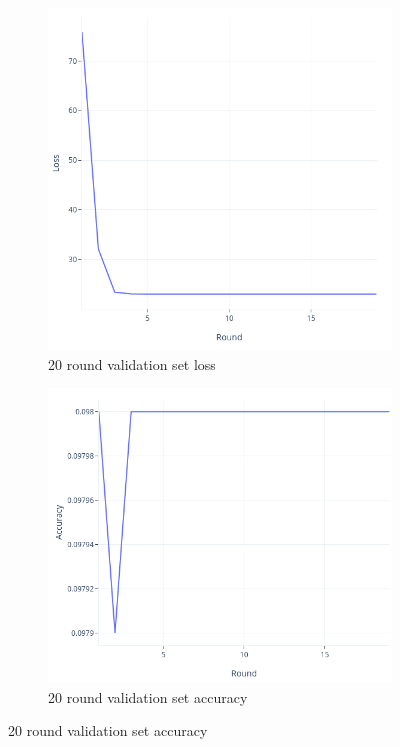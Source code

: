 \documentclass[12pt]{article}
\begin{document}
\begin{figure}
\begin{subfigure}{.5\textwidth}
  \centering
  \includegraphics[scale=0.5]{loss}
  \caption{20 round validation set loss}
  \label{fig:loss}
\end{subfigure}
\begin{subfigure}{.5\textwidth}
  \centering
  \includegraphics[scale=0.5]{accuracy}
  \caption{20 round validation set accuracy}
  \label{fig:accuracy}
\end{subfigure}
\end{figure}
\end{document}
